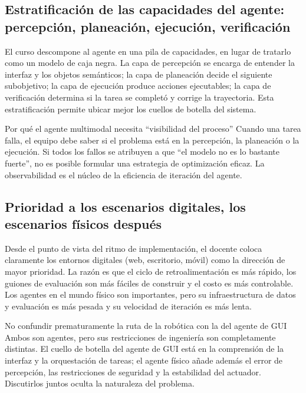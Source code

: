 \documentclass[a4paper]{article}
\begin{document}
\subsection{Estratificación de las capacidades del agente: percepción, planeación, ejecución, verificación}
El curso descompone al agente en una pila de capacidades, en lugar de tratarlo como un modelo de caja negra. La capa de percepción se encarga de entender la interfaz y los objetos semánticos; la capa de planeación decide el siguiente subobjetivo; la capa de ejecución produce acciones ejecutables; la capa de verificación determina si la tarea se completó y corrige la trayectoria. Esta estratificación permite ubicar mejor los cuellos de botella del sistema.

\begin{knowledgebox}{Por qué el agente multimodal necesita ``visibilidad del proceso''}
Cuando una tarea falla, el equipo debe saber si el problema está en la percepción, la planeación o la ejecución. Si todos los fallos se atribuyen a que ``el modelo no es lo bastante fuerte'', no es posible formular una estrategia de optimización eficaz. La observabilidad es el núcleo de la eficiencia de iteración del agente.
\end{knowledgebox}

\subsection{Prioridad a los escenarios digitales, los escenarios físicos después}
Desde el punto de vista del ritmo de implementación, el docente coloca claramente los entornos digitales (web, escritorio, móvil) como la dirección de mayor prioridad. La razón es que el ciclo de retroalimentación es más rápido, los guiones de evaluación son más fáciles de construir y el costo es más controlable. Los agentes en el mundo físico son importantes, pero su infraestructura de datos y evaluación es más pesada y su velocidad de iteración es más lenta.

\begin{warningbox}{No confundir prematuramente la ruta de la robótica con la del agente de GUI}
Ambos son agentes, pero sus restricciones de ingeniería son completamente distintas. El cuello de botella del agente de GUI está en la comprensión de la interfaz y la orquestación de tareas; el agente físico añade además el error de percepción, las restricciones de seguridad y la estabilidad del actuador. Discutirlos juntos oculta la naturaleza del problema.
\end{warningbox}
\end{document}
